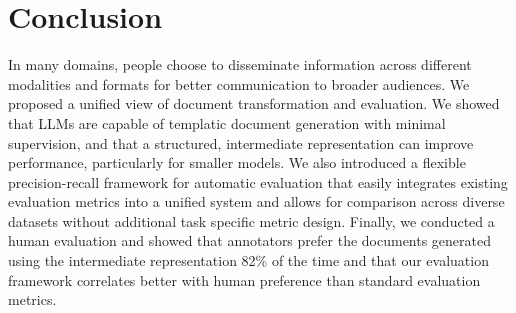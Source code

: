 \section{Conclusion}

In many domains, people choose to disseminate information across different modalities and formats for better communication to broader audiences. We proposed a unified view of document transformation and evaluation. We showed that LLMs are capable of templatic document generation with minimal supervision, and that a structured, intermediate representation can improve performance, particularly for smaller models. We also introduced a flexible precision-recall framework for automatic evaluation that easily integrates existing evaluation metrics into a unified system and allows for comparison across diverse datasets without additional task specific metric design. Finally, we conducted a human evaluation and showed that annotators prefer the documents generated using the intermediate representation 82\% of the time and that our evaluation framework correlates better with human preference than standard evaluation metrics.
